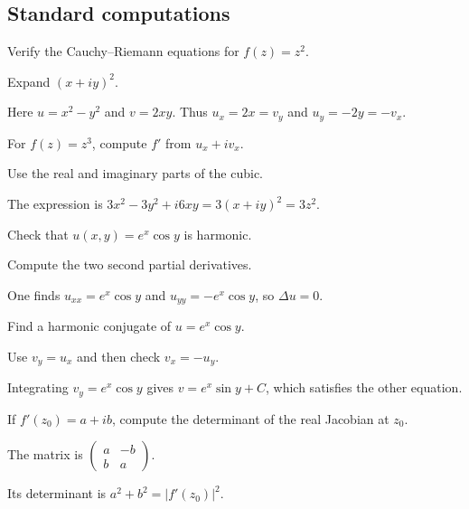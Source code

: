 \subsection*{Standard computations}

\begin{exercise}\label{exr:iv02-expand-01}
Verify the Cauchy--Riemann equations for \(f(z)=z^2\).
\end{exercise}
\begin{hint}
Expand \((x+iy)^2\).
\end{hint}
\begin{solution}
Here \(u=x^2-y^2\) and \(v=2xy\). Thus \(u_x=2x=v_y\) and \(u_y=-2y=-v_x\).
\end{solution}

\begin{exercise}\label{exr:iv02-expand-02}
For \(f(z)=z^3\), compute \(f'\) from \(u_x+iv_x\).
\end{exercise}
\begin{hint}
Use the real and imaginary parts of the cubic.
\end{hint}
\begin{solution}
The expression is \(3x^2-3y^2+i6xy=3(x+iy)^2=3z^2\).
\end{solution}

\begin{exercise}\label{exr:iv02-expand-03}
Check that \(u(x,y)=e^x\cos y\) is harmonic.
\end{exercise}
\begin{hint}
Compute the two second partial derivatives.
\end{hint}
\begin{solution}
One finds \(u_{xx}=e^x\cos y\) and \(u_{yy}=-e^x\cos y\), so \(\Delta u=0\).
\end{solution}

\begin{exercise}\label{exr:iv02-expand-04}
Find a harmonic conjugate of \(u=e^x\cos y\).
\end{exercise}
\begin{hint}
Use \(v_y=u_x\) and then check \(v_x=-u_y\).
\end{hint}
\begin{solution}
Integrating \(v_y=e^x\cos y\) gives \(v=e^x\sin y+C\), which satisfies the other equation.
\end{solution}

\begin{exercise}\label{exr:iv02-expand-05}
If \(f'(z_0)=a+ib\), compute the determinant of the real Jacobian at \(z_0\).
\end{exercise}
\begin{hint}
The matrix is \(\begin{pmatrix}a&-b\\b&a\end{pmatrix}\).
\end{hint}
\begin{solution}
Its determinant is \(a^2+b^2=|f'(z_0)|^2\).
\end{solution}

